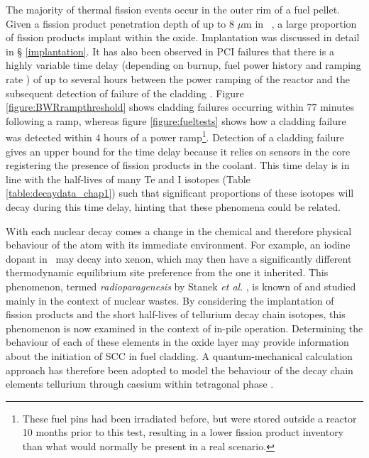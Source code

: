 The majority of thermal fission events occur in the outer rim of a fuel pellet. Given a fission product penetration depth of up to 8 $\mu$m in \zirconia\ \cite{degueldre2001behaviour}, a large proportion of fission products implant within the oxide. Implantation was discussed in detail in § \ref{implantation}. It has also been observed in PCI failures that there is a highly variable time delay (depending on burnup, fuel power history and ramping rate \cite{international2003iaea}) of up to several hours between the power ramping of the reactor and the subsequent detection of failure of the cladding \cite{bergenlid1980experimental, wood1983effects, pankaskie1981mechanistic}. Figure \ref{figure:BWRrampthreshold} shows cladding failures occurring within 77 minutes following a ramp, whereas figure \ref{figure:fueltests} shows how a cladding failure was detected within 4 hours of a power ramp\footnote{These fuel pins had been irradiated before, but were stored outside a reactor 10 months prior to this test, resulting in a lower fission product inventory than what would normally be present in a real scenario.}. Detection of a cladding failure gives an upper bound for the time delay because it relies on sensors in the core registering the presence of fission products in the coolant. This time delay is in line with the half-lives of many Te and I isotopes (Table \ref{table:decaydata_chap1}) such that significant proportions of these isotopes will decay during this time delay, hinting that these phenomena could be related. 

With each nuclear decay comes a change in the chemical and therefore physical behaviour of the atom with its immediate environment. For example, an iodine dopant in \zirconia\ may decay into xenon, which may then have a significantly different thermodynamic equilibrium site preference from the one it inherited. This phenomenon, termed \emph{radioparagenesis} by Stanek \emph{et al}. \cite{stanek2010radioparagenesis}, is known of and studied mainly in the context of nuclear wastes. By considering the implantation of fission products and the short half-lives of tellurium decay chain isotopes, this phenomenon is now examined in the context of in-pile operation. Determining the behaviour of each of these elements in the oxide layer may provide information about the initiation of SCC in fuel cladding. A quantum-mechanical calculation approach has therefore been adopted to model the behaviour of the decay chain elements tellurium through caesium within tetragonal phase \zirconia.


